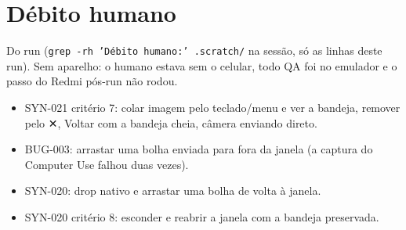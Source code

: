 \documentclass[11pt,a4paper]{article}
\begin{document}
\section{Débito humano}
Do run (\texttt{grep -rh 'Débito humano:' .scratch/} na sessão, só as linhas
deste run). Sem aparelho: o humano estava sem o celular, todo QA foi no
emulador e o passo do Redmi pós-run não rodou.
\begin{itemize}
  \item SYN-021 critério 7: colar imagem pelo teclado/menu e ver a bandeja,
        remover pelo ✕, Voltar com a bandeja cheia, câmera enviando direto.
  \item BUG-003: arrastar uma bolha enviada para fora da janela (a captura do
        Computer Use falhou duas vezes).
  \item SYN-020: drop nativo e arrastar uma bolha de volta à janela.
  \item SYN-020 critério 8: esconder e reabrir a janela com a bandeja
        preservada.
\end{itemize}
\end{document}
